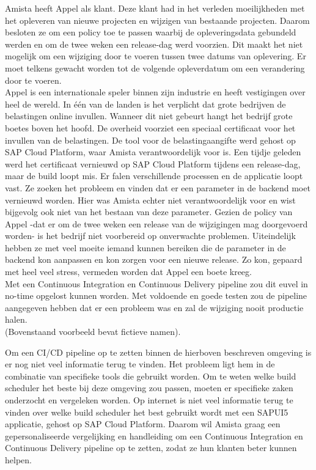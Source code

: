 Amista heeft Appel als klant. Deze klant had in het verleden moeilijkheden met het opleveren van nieuwe projecten en wijzigen van bestaande projecten. Daarom besloten ze om een policy toe te passen waarbij de opleveringsdata gebundeld werden en om de twee weken een release-dag werd voorzien. Dit maakt het niet mogelijk om een wijziging door te voeren tussen twee datums van oplevering. Er moet telkens gewacht worden tot de volgende opleverdatum om een verandering door te voeren.\\
Appel is een internationale speler binnen zijn industrie en heeft vestigingen over heel de wereld. In één van de landen is het verplicht dat grote bedrijven de belastingen online invullen. Wanneer dit niet gebeurt hangt het bedrijf grote boetes boven het hoofd. De overheid voorziet een speciaal certificaat voor het invullen van de belastingen. De tool voor de belastingaangifte werd gehost op SAP Cloud Platform, waar Amista verantwoordelijk voor is. Een tijdje geleden werd het certificaat vernieuwd op SAP Cloud Platform tijdens een release-dag, maar de build loopt mis. Er falen verschillende processen en de applicatie loopt vast. Ze zoeken het probleem en vinden dat er een parameter in de backend moet vernieuwd worden. Hier was Amista echter niet verantwoordelijk voor en wist bijgevolg ook niet van het bestaan van deze parameter. Gezien de policy van Appel -dat er om de twee weken een release van de wijzigingen mag doorgevoerd worden- is het bedrijf niet voorbereid op onverwachte problemen. Uiteindelijk hebben ze met veel moeite iemand kunnen bereiken die de parameter in de backend kon aanpassen en kon zorgen voor een nieuwe release. Zo kon, gepaard met heel veel stress, vermeden worden dat Appel een boete kreeg.\\
Met een Continuous Integration en Continuous Delivery pipeline zou dit euvel in no-time opgelost kunnen worden. Met voldoende en goede testen zou de pipeline aangegeven hebben dat er een probleem was en zal de wijziging nooit productie halen.\\
(Bovenstaand voorbeeld bevat fictieve namen).

Om een CI/CD pipeline op te zetten binnen de hierboven beschreven omgeving is er nog niet veel informatie terug te vinden. Het probleem ligt hem in de combinatie van specifieke tools die gebruikt worden. Om te weten welke build scheduler het beste bij deze omgeving zou passen, moeten er specifieke zaken onderzocht en vergeleken worden. Op internet is niet veel informatie terug te vinden over welke build scheduler het best gebruikt wordt met een SAPUI5 applicatie, gehost op SAP Cloud Platform. Daarom wil Amista graag een gepersonaliseerde vergelijking en handleiding om een Continuous Integration en Continuous Delivery pipeline op te zetten, zodat ze hun klanten beter kunnen helpen.

